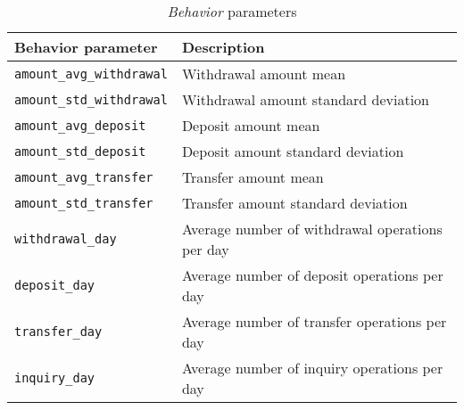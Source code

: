 \begin{table}[H]
    \centering
    \begin{tabular}{|l|l|}
        \hline
        \textbf{Behavior parameter} & \textbf{Description} \\ 
        \hline
        \texttt{amount\_avg\_withdrawal} & Withdrawal amount mean\\ 
        \hline
        \texttt{amount\_std\_withdrawal} & Withdrawal amount standard deviation \\ 
        \hline
        \texttt{amount\_avg\_deposit} & Deposit amount mean \\ 
        \hline
        \texttt{amount\_std\_deposit} & Deposit amount standard deviation\\ 
        \hline
        \texttt{amount\_avg\_transfer} & Transfer amount mean \\ 
        \hline
        \texttt{amount\_std\_transfer} & Transfer amount standard deviation \\ 
        \hline
        \texttt{withdrawal\_day} & Average number of withdrawal operations per day \\ 
        \hline
        \texttt{deposit\_day} & Average number of deposit operations per day \\ 
        \hline
        \texttt{transfer\_day} & Average number of transfer operations per day \\ 
        \hline
        \texttt{inquiry\_day} & Average number of inquiry operations per day \\ 
        \hline
    \end{tabular}
    \caption{\emph{Behavior} parameters}
    \label{table:behavior-parameters}
\end{table}
